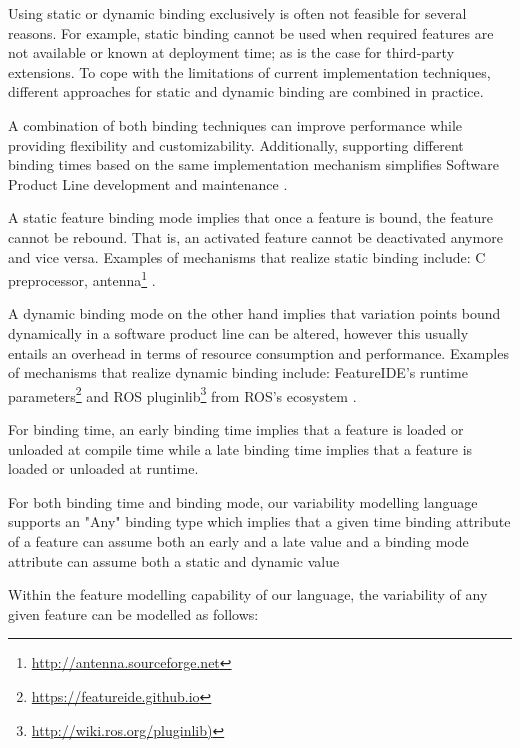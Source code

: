 \documentclass[conference]{IEEEtran}
\newcommand{\foot}[1]{\footnote{\url{#1}}}
\begin{document}
Using static or dynamic binding exclusively is often not feasible for several reasons. For example, static binding cannot be used when required features are not available or known at deployment time; as is the case for third-party extensions. To cope with the limitations of current implementation techniques, different approaches for static and dynamic binding are combined in practice.

A combination of both binding techniques can improve performance while providing flexibility and customizability. Additionally, supporting different binding times based on the same implementation mechanism simplifies Software Product Line development and maintenance \cite{flex-feat-bind}.

A static feature binding mode implies that once a feature is bound, the feature cannot be rebound. That is, an activated feature cannot be deactivated anymore and vice versa. Examples of mechanisms that realize static binding include: C preprocessor, antenna\foot{http://antenna.sourceforge.net} \cite{flex-feat-bind}.

A dynamic binding mode on the other hand implies that variation points bound dynamically in a software product line can be altered, however this usually entails an overhead in terms of resource consumption and performance. Examples of mechanisms that realize dynamic binding include: FeatureIDE's runtime parameters\foot{https://featureide.github.io} and ROS pluginlib\foot{http://wiki.ros.org/pluginlib)} from ROS's ecosystem \cite{flex-feat-bind}.

For binding time, an early binding time implies that a feature is loaded or unloaded at compile time while a late binding time implies that a feature is loaded or unloaded at runtime.

For both binding time and binding mode, our variability modelling language supports an "Any" binding type which implies that a given time binding attribute of a feature can assume both an early and a late value and a binding mode attribute can assume both a static and dynamic value

Within the feature modelling capability of our language, the variability of any given feature can be modelled as follows:
\end{document}
